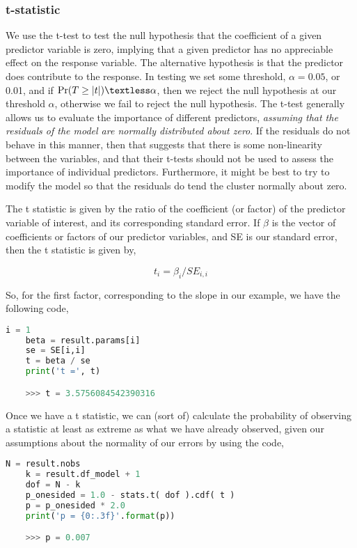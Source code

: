 \subsubsection{t-statistic}

We use the t-test to test the null hypothesis that the coefficient of a given predictor variable is zero, implying that a given predictor has no appreciable effect on the response variable. The alternative hypothesis is that the predictor does contribute to the response. In testing we set some threshold, $\alpha = 0.05$, or  0.01, and if $\Pr(T \ge \vert t \vert) \textless \alpha$, then we reject the null hypothesis at our threshold $\alpha$, otherwise we fail to reject the null hypothesis. The t-test generally allows us to evaluate the importance of different predictors, \emph{assuming that the residuals of the model are normally distributed about zero}. If the residuals do not behave in this manner, then that suggests that there is some non-linearity between the variables, and that their t-tests should not be used to assess the importance of individual predictors. Furthermore, it might be best to try to modify the model so that the residuals do tend the cluster normally about zero.

The t statistic is given by the ratio of the coefficient (or factor) of the predictor variable of interest, and its corresponding standard error. If $\beta$ is the vector of coefficients or factors of our predictor variables, and SE is our standard error, then the t statistic is given by,

\begin{equation}
    t_{i} = \beta_{i} / SE_{i,i}
\end{equation}

So, for the first factor, corresponding to the slope in our example, we have the following code,

\begin{lstlisting}[language=Python]
    i = 1
    beta = result.params[i]
    se = SE[i,i]
    t = beta / se
    print('t =', t)

    >>> t = 3.5756084542390316
\end{lstlisting}

Once we have a t statistic, we can (sort of) calculate the probability of observing a statistic at least as extreme as what we have already observed, given our assumptions about the normality of our errors by using the code,

\begin{lstlisting}[language=Python]
    N = result.nobs
    k = result.df_model + 1
    dof = N - k
    p_onesided = 1.0 - stats.t( dof ).cdf( t )
    p = p_onesided * 2.0
    print('p = {0:.3f}'.format(p))

    >>> p = 0.007
\end{lstlisting}

